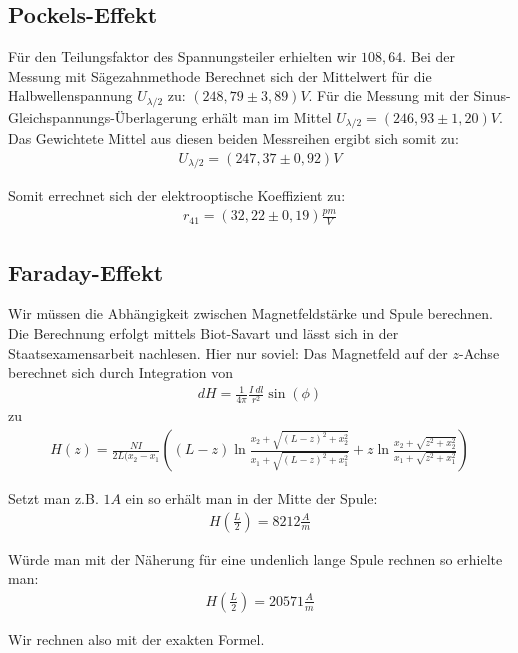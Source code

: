 \documentclass[12pt]{article}
\begin{document}
\subsection{Pockels-Effekt}
Für den Teilungsfaktor des Spannungsteiler erhielten wir $108,64$.
Bei der Messung mit Sägezahnmethode Berechnet sich der Mittelwert für die Halbwellenspannung $U_{\lambda / 2}$ zu: $(248,79 \pm 3,89)V$. Für die Messung mit der Sinus-Gleichspannungs-Überlagerung erhält man im Mittel $U_{\lambda /2} = (246,93 \pm 1,20)V$.\\

Das Gewichtete Mittel aus diesen beiden Messreihen ergibt sich somit zu: 
\begin{align*}
 U_{\lambda / 2} = (247,37 \pm 0,92)V
\end{align*}

Somit errechnet sich der elektrooptische Koeffizient zu:
\begin{align*}
 r_{41} = (32,22 \pm 0,19) \frac{pm}{V}
\end{align*}


\subsection{Faraday-Effekt}
Wir müssen die Abhängigkeit zwischen Magnetfeldstärke und Spule berechnen. Die Berechnung erfolgt mittels Biot-Savart und lässt sich in der Staatsexamensarbeit nachlesen. Hier nur soviel:
Das Magnetfeld auf der $z$-Achse berechnet sich durch Integration von
\begin{align}
 dH = \frac{1}{4\pi}\frac{I~dl}{r^2} \sin(\phi)
\end{align}
zu
\begin{align}
 H(z) = \frac{NI}{2L(x_2-x_1}\left((L-z)\ln\frac{x_2 + \sqrt{(L-z)^2 + x_2^2}}{x_1 + \sqrt{(L-z)^2 + x_1^2}} + z \ln \frac{x_2 + \sqrt{z^2 + x_2^2}}{x_1 + \sqrt{z^2 + x_1^2}}\right)
\end{align}

Setzt man z.B. $1A$ ein so erhält man in der Mitte der Spule:
\begin{align}
 H\left(\frac{L}{2}\right) = 8212 \frac{A}{m}
\end{align}

Würde man mit der Näherung für eine undenlich lange Spule rechnen so erhielte man:
\begin{align}
 H\left(\frac{L}{2}\right) = 20571 \frac{A}{m}
\end{align}

Wir rechnen also mit der exakten Formel.
\end{document}
